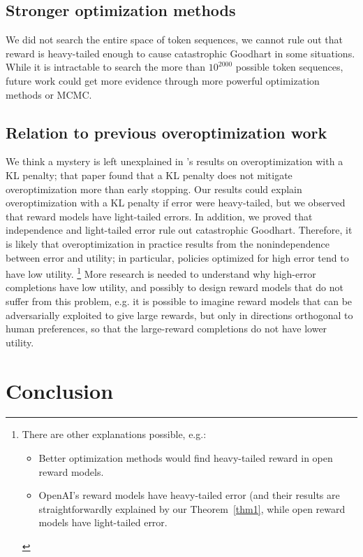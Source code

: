 \documentclass{article}
\begin{document}
\subsection{Stronger optimization methods}

We did not search the entire space of token sequences, we cannot rule out that reward is heavy-tailed enough to cause catastrophic Goodhart in some situations. While it is intractable to search the more than $10^{2000}$ possible token sequences, future work could get more evidence through more powerful optimization methods or MCMC.

\subsection{Relation to previous overoptimization work}

We think a mystery is left unexplained in \citep{gao2023scaling}'s results on overoptimization with a KL penalty; that paper found that a KL penalty does not mitigate overoptimization more than early stopping. Our results could explain overoptimization with a KL penalty if error were heavy-tailed, but we observed that reward models have light-tailed errors. In addition, we proved that independence and light-tailed error rule out catastrophic Goodhart. Therefore, it is likely that overoptimization in practice results from the nonindependence between error and utility; in particular, policies optimized for high error tend to have low utility. \footnote{There are other explanations possible, e.g.:
\begin{itemize}
\item Better optimization methods would find heavy-tailed reward in open reward models.
\item OpenAI's reward models have heavy-tailed error (and their results are straightforwardly explained by our Theorem~\ref{thm1}, while open reward models have light-tailed error.
\end{itemize}
}
More research is needed to understand why high-error completions have low utility, and possibly to design reward models that do not suffer from this problem, e.g. it is possible to imagine reward models that can be adversarially exploited to give large rewards, but only in directions orthogonal to human preferences, so that the large-reward completions do not have lower utility.

\section{Conclusion}
\end{document}

